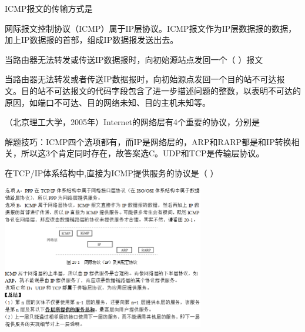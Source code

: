 \question ICMP报文的传输方式是
\par{}
\begin{solution}网际报文控制协议（ICMP）属于IP层协议。ICMP报文作为IP层数据报的数据，加上IP数据报的首部，组成IP数据报发送出去。
\end{solution}
\question 当路由器无法转发或传送IP数据报时，向初始源站点发回一个（ ）报文
\par{}
\begin{solution}当路由器无法转发或者传送IP数据报时，向初始源点发回一个目的站不可达报文。目的站不可达报文的代码字段包含了进一步描述问题的整数，以表明不可达的原因，如端口不可达、目的网络未知、目的主机未知等。
\end{solution}
\question （北京理工大学，2005年）Internet的网络层有4个重要的协议，分别是
\par{}
\begin{solution}解题技巧：ICMP四个选项都有，而IP是网络层的，ARP和RARP都是和IP转换相关，所以这3个肯定同时存在，故答案选C。UDP和TCP是传输层协议。
\end{solution}
\question 在TCP/IP体系结构中,直接为ICMP提供服务的协议是（ ）
\par{}
\begin{solution}\includegraphics[width=3.46875in,height=2.48958in]{computerassets/1A93DAF555282F20061DC42F39C4EF55.png}
\end{solution}
